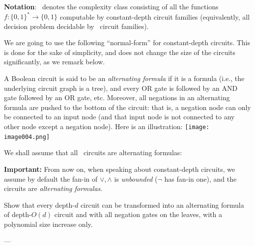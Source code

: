 \textbf{Notation}: \ACZ\ denotes the complexity class 
consisting of all the functions $f:\{0,1\}^* \rightarrow\{0,1\}$ computable by  constant-depth circuit families  (equivalently, all decision problem decidable by \ACZ\ circuit families).



We are going to use the following ``normal-form'' for constant-depth circuits. This is done for the sake of simplicity, and does not change the size of the circuits significantly, as we remark below.


A Boolean circuit is said to be an \emph{alternating  formula} if it is a formula (i.e., the underlying circuit graph is a tree), and every OR gate is followed by an AND gate followed by an OR gate, etc. Moreover, all negations in an alternating formula are pushed to the bottom of the circuit: that is, a negation node can only be connected to an input node (and that input node is not connected to any other node except a negation node). 
Here is an illustration:
\texttt{[image: image004.png]}

We shall assume that all \ACZ\ circuits are alternating formulas:


\begin{svgraybox}
\textbf{Important:} From now on, when speaking about constant-depth circuits, we assume by default the fan-in of $\lor, \land$ is \emph{unbounded} ($\neg$ has fan-in one), and the circuits are \emph{alternating formulas}. 
\end{svgraybox}

\begin{exercise}
Show that every depth-$d$ circuit can be transformed into an alternating formula of depth-$O(d)$ circuit and with all negation gates on the leaves, with a polynomial size increase only.

\noindent---

\end{exercise}

